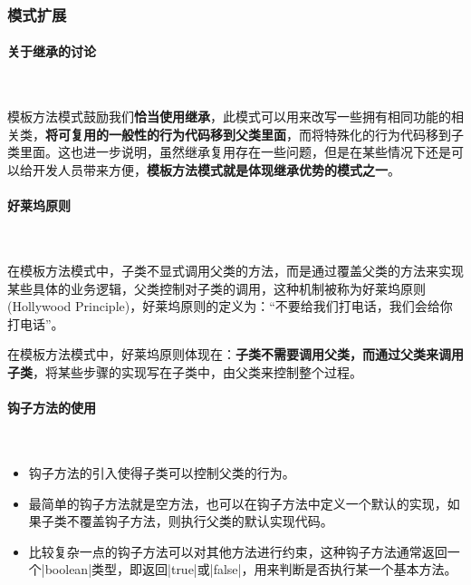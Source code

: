 \subsubsection{模式扩展}

\paragraph*{关于继承的讨论}~{} \par
模板方法模式鼓励我们\textbf{恰当使用继承}，此模式可以用来改写一些拥有相同功能的相关类，\textbf{将可复用的一般性的行为代码移到父类里面}，而将特殊化的行为代码移到子类里面。这也进一步说明，虽然继承复用存在一些问题，但是在某些情况下还是可以给开发人员带来方便，\textbf{模板方法模式就是体现继承优势的模式之一}。

\paragraph*{好莱坞原则}~{} \par
在模板方法模式中，子类不显式调用父类的方法，而是通过覆盖父类的方法来实现某些具体的业务逻辑，父类控制对子类的调用，这种机制被称为好莱坞原则(Hollywood Principle)，好莱坞原则的定义为：“不要给我们打电话，我们会给你打电话”。

在模板方法模式中，好莱坞原则体现在：\textbf{子类不需要调用父类，而通过父类来调用子类}，将某些步骤的实现写在子类中，由父类来控制整个过程。

\paragraph*{钩子方法的使用}~{} \par
\begin{itemize}
    \item 钩子方法的引入使得子类可以控制父类的行为。
    \item 最简单的钩子方法就是空方法，也可以在钩子方法中定义一个默认的实现，如果子类不覆盖钩子方法，则执行父类的默认实现代码。
    \item 比较复杂一点的钩子方法可以对其他方法进行约束，这种钩子方法通常返回一个\sverb|boolean|\;类型，即返回\sverb|true|\;或\sverb|false|，用来判断是否执行某一个基本方法。
\end{itemize}

